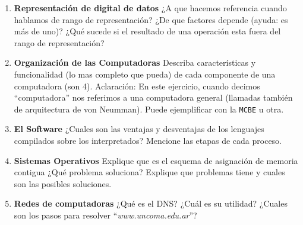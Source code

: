 \documentclass[12pt]{article}
\def\maketitle{

\makeatletter{
    \color{blue} \centering \huge \sc
    \textbf{
        Examen final regular
    }\\
    \par
}
\makeatother

\makeatletter


}
\begin{document}
\begin{minipage}[c]{\linewidth}
\thispagestyle{empty}
\maketitle

\begin{enumerate}[topsep=4pt,itemsep=2pt,partopsep=2pt, parsep=2pt]

    \item \textbf{Representación de digital de datos}
        ¿A que hacemos referencia cuando hablamos de rango de representación?
        ¿De que factores depende (ayuda: es más de uno)? ¿Qué sucede si el
        resultado de una operación esta fuera del rango de representación?

    \item \textbf{Organización de las Computadoras}
        Describa características y funcionalidad (lo mas completo que pueda)
        de cada componente de una computadora (son 4). Aclaración: En este
        ejercicio, cuando decimos ``computadora'' nos referimos a una
        computadora general (llamadas también de arquitectura de von Neumman).
        Puede ejemplificar con la \texttt{MCBE} u otra.

    \item \textbf{El Software}
        ¿Cuales son las ventajas y desventajas de los lenguajes compilados
        sobre los interpretados? Mencione las etapas de cada proceso.

    \item \textbf{Sistemas Operativos}
        Explique que es el esquema de asignación de memoria contigua ¿Qué
        problema soluciona? Explique que problemas tiene y cuales son las
        posibles soluciones.

    \item \textbf{Redes de computadoras}
        ¿Qué es el DNS? ¿Cuál es su utilidad? ¿Cuales son los pasos para
        resolver ``\emph{www.uncoma.edu.ar}''?

\end{enumerate}
\end{minipage}

\vspace{5em}
\end{document}
